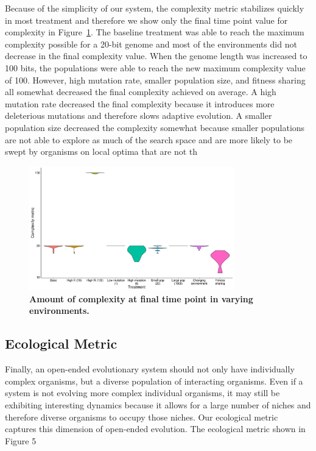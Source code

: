 \documentclass[letterpaper]{article}
\begin{document}
Because of the simplicity of our system, the complexity metric stabilizes quickly in most treatment and therefore we show only the final time point value for complexity in Figure~\ref{complexity}. The baseline treatment was able to reach the maximum complexity possible for a 20-bit genome and most of the environments did not decrease in the final complexity value. When the genome length was increased to 100 bits, the populations were able to reach the new maximum complexity value of 100. However, high mutation rate, smaller population size, and fitness sharing all somewhat decreased the final complexity achieved on average. A high mutation rate decreased the final complexity because it introduces more deleterious mutations and therefore slows adaptive evolution. A smaller population size decreased the complexity somewhat because smaller populations are not able to explore as much of the search space and are more likely to be swept by organisms on local optima that are not th

\begin{figure}
\includegraphics[width=3.5in]{figs/complexityboxplots.png}
\caption{\textbf{Amount of complexity at final time point in varying environments.} }
\label{complexity}
\end{figure}

\subsection{Ecological Metric}
Finally, an open-ended evolutionary system should not only have individually complex organisms, but a diverse population of interacting organisms. Even if a system is not evolving more complex individual organisms, it may still be exhibiting interesting dynamics because it allows for a large number of niches and therefore diverse organisms to occupy those niches. Our ecological metric captures this dimension of open-ended evolution. The ecological metric shown in Figure 5 
\end{document}
